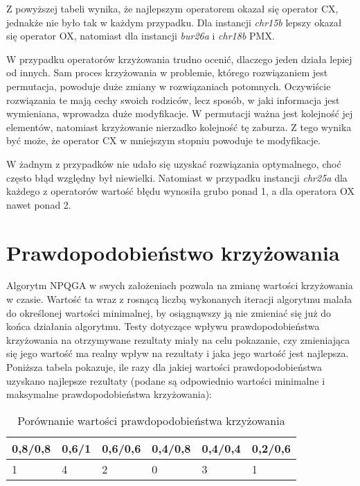 Z powyższej tabeli wynika, że najlepszym operatorem okazał się operator CX, jednakże nie było tak w każdym przypadku. Dla instancji \textit{chr15b} lepszy okazał się operator OX, natomiast dla instancji \textit{bur26a} i \textit{chr18b} PMX.

W przypadku operatorów krzyżowania trudno ocenić, dlaczego jeden działa lepiej od innych. Sam proces krzyżowania w problemie, którego rozwiązaniem jest permutacja, powoduje duże zmiany w rozwiązaniach potomnych. Oczywiście rozwiązania te mają cechy swoich rodziców, lecz sposób, w jaki informacja jest wymieniana, wprowadza duże modyfikacje. W permutacji ważna jest kolejność jej elementów, natomiast krzyżowanie nierzadko kolejność tę zaburza. Z tego wynika być może, że operator CX w mniejszym stopniu powoduje te modyfikacje.

W żadnym z przypadków nie udało się uzyskać rozwiązania optymalnego, choć często błąd względny był niewielki. Natomiast w przypadku instancji \textit{chr25a} dla każdego z operatorów wartość błędu wynosiła grubo ponad 1, a dla operatora OX nawet ponad 2.

\section{Prawdopodobieństwo krzyżowania}
Algorytm NPQGA w swych założeniach pozwala na zmianę wartości krzyżowania w czasie. Wartość ta wraz z rosnącą liczbą wykonanych iteracji algorytmu malała do określonej wartości minimalnej, by osiągnąwszy ją nie zmieniać się już do końca działania algorytmu. Testy dotyczące wpływu prawdopodobieństwa krzyżowania na otrzymywane rezultaty miały na celu pokazanie, czy zmieniająca się jego wartość ma realny wpływ na rezultaty i jaka jego wartość jest najlepsza. Poniższa tabela pokazuje, ile razy dla jakiej wartości prawdopodobieństwa uzyskano najlepsze rezultaty (podane są odpowiednio wartości minimalne i maksymalne prawdopodobieństwa krzyżowania):

\begin{table}[H]
\label{cross_prob_results}
\begin{center}
\begin{tabular}{l l l l l l}
\hline
0,8/0,8 & 0,6/1 & 0,6/0,6 & 0,4/0,8 & 0,4/0,4 & 0,2/0,6\\
\hline
1 & 4 & 2 & 0 & 3 & 1\\
\hline
\end{tabular}
\end{center}
\caption{Porównanie wartości prawdopodobieństwa krzyżowania}
\end{table}

